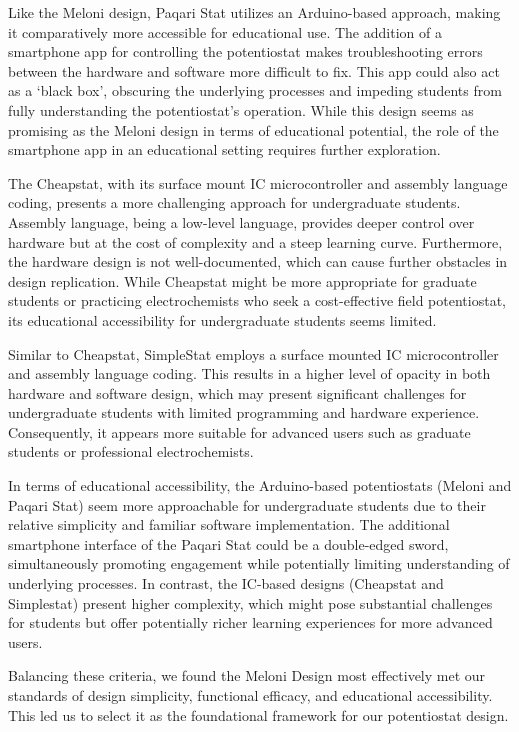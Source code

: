 \documentclass{article}
\begin{document}
Like the Meloni design, Paqari Stat utilizes an Arduino-based approach, making it comparatively more accessible for educational use. The addition of a smartphone app for controlling the potentiostat makes troubleshooting errors between the hardware and software more difficult to fix. This app could also act as a `black box', obscuring the underlying processes and impeding students from fully understanding the potentiostat's operation. While this design seems as promising as the Meloni design in terms of educational potential, the role of the smartphone app in an educational setting requires further exploration.


The Cheapstat, with its surface mount IC microcontroller and assembly language coding, presents a more challenging approach for undergraduate students. Assembly language, being a low-level language, provides deeper control over hardware but at the cost of complexity and a steep learning curve. Furthermore, the hardware design is not well-documented, which can cause further obstacles in design replication. While Cheapstat might be more appropriate for graduate students or practicing electrochemists who seek a cost-effective field potentiostat, its educational accessibility for undergraduate students seems limited.


Similar to Cheapstat, SimpleStat employs a surface mounted IC microcontroller and assembly language coding. This results in a higher level of opacity in both hardware and software design, which may present significant challenges for undergraduate students with limited programming and hardware experience. Consequently, it appears more suitable for advanced users such as graduate students or professional electrochemists.


In terms of educational accessibility, the Arduino-based potentiostats (Meloni and Paqari Stat) seem more approachable for undergraduate students due to their relative simplicity and familiar software implementation. The additional smartphone interface of the Paqari Stat could be a double-edged sword, simultaneously promoting engagement while potentially limiting understanding of underlying processes. In contrast, the IC-based designs (Cheapstat and Simplestat) present higher complexity, which might pose substantial challenges for students but offer potentially richer learning experiences for more advanced users.


Balancing these criteria, we found the Meloni Design most effectively met our standards of design simplicity, functional efficacy, and educational accessibility. This led us to select it as the foundational framework for our potentiostat design.
\end{document}
